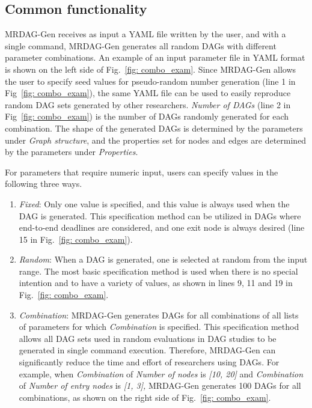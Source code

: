 \subsection{Common functionality}
\label{ssec: common}

MRDAG-Gen receives as input a YAML file written by the user, and with a single command, MRDAG-Gen generates all random DAGs with different parameter combinations.
An example of an input parameter file in YAML format is shown on the left side of Fig.~\ref{fig: combo_exam}.
Since MRDAG-Gen allows the user to specify seed values for pseudo-random number generation (line 1 in Fig~\ref{fig: combo_exam}), the same YAML file can be used to easily reproduce random DAG sets generated by other researchers.
    {\it Number of DAGs} (line 2 in Fig~\ref{fig: combo_exam}) is the number of DAGs randomly generated for each combination.
The shape of the generated DAGs is determined by the parameters under {\it Graph structure}, and the properties set for nodes and edges are determined by the parameters under {\it Properties}.

For parameters that require numeric input, users can specify values in the following three ways.
\begin{enumerate}
    \item {\it Fixed}: Only one value is specified, and this value is always used when the DAG is generated. This specification method can be utilized in DAGs where end-to-end deadlines are considered, and one exit node is always desired (line 15 in Fig.~\ref{fig: combo_exam}).
    \item {\it Random}: When a DAG is generated, one is selected at random from the input range. The most basic specification method is used when there is no special intention and to have a variety of values, as shown in lines 9, 11 and 19 in Fig.~\ref{fig: combo_exam}.
    \item {\it Combination}: MRDAG-Gen generates DAGs for all combinations of all lists of parameters for which {\it Combination} is specified. This specification method allows all DAG sets used in random evaluations in DAG studies to be generated in single command execution. Therefore, MRDAG-Gen can significantly reduce the time and effort of researchers using DAGs. For example, when {\it Combination} of {\it Number of nodes} is {\it [10, 20]} and {\it Combination} of {\it Number of entry nodes} is {\it [1, 3],} MRDAG-Gen generates 100 DAGs for all combinations, as shown on the right side of Fig.~\ref{fig: combo_exam}.
\end{enumerate}

